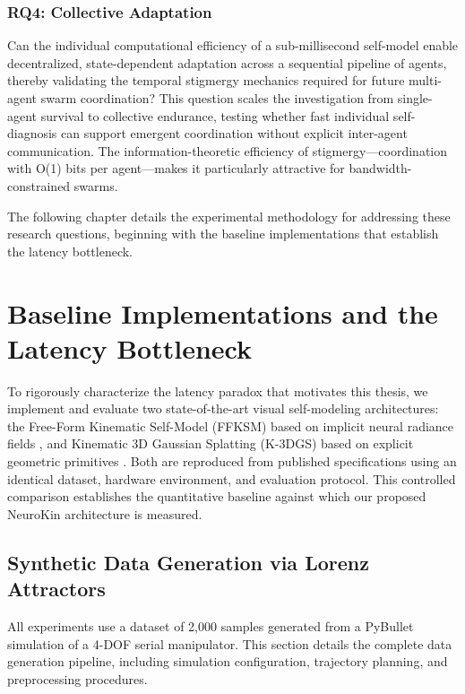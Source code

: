 \documentclass[12pt,a4paper,oneside]{report}
\begin{document}
\subsection{RQ4: Collective Adaptation}

Can the individual computational efficiency of a sub-millisecond self-model enable decentralized, state-dependent adaptation across a sequential pipeline of agents, thereby validating the temporal stigmergy mechanics required for future multi-agent swarm coordination? This question scales the investigation from single-agent survival to collective endurance, testing whether fast individual self-diagnosis can support emergent coordination without explicit inter-agent communication. The information-theoretic efficiency of stigmergy---coordination with O(1) bits per agent---makes it particularly attractive for bandwidth-constrained swarms.

The following chapter details the experimental methodology for addressing these research questions, beginning with the baseline implementations that establish the latency bottleneck.
\clearpage

\chapter{Baseline Implementations and the Latency Bottleneck}

To rigorously characterize the latency paradox that motivates this thesis, we implement and evaluate two state-of-the-art visual self-modeling architectures: the Free-Form Kinematic Self-Model (FFKSM) based on implicit neural radiance fields \cite{hu2024teaching}, and Kinematic 3D Gaussian Splatting (K-3DGS) based on explicit geometric primitives \cite{hu2025learning}. Both are reproduced from published specifications using an identical dataset, hardware environment, and evaluation protocol. This controlled comparison establishes the quantitative baseline against which our proposed NeuroKin architecture is measured.

\section{Synthetic Data Generation via Lorenz Attractors}

All experiments use a dataset of 2,000 samples generated from a PyBullet simulation of a 4-DOF serial manipulator. This section details the complete data generation pipeline, including simulation configuration, trajectory planning, and preprocessing procedures.
\end{document}
